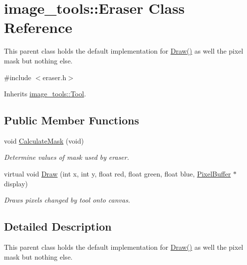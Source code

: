 \hypertarget{classimage__tools_1_1Eraser}{}\section{image\+\_\+tools\+:\+:Eraser Class Reference}
\label{classimage__tools_1_1Eraser}


This parent class holds the default implementation for \hyperlink{classimage__tools_1_1Eraser_a4c644291d415b8af7b60c0aaa9940345}{Draw()} as well the pixel mask but nothing else.  




{\ttfamily \#include $<$eraser.\+h$>$}



Inherits \hyperlink{classimage__tools_1_1Tool}{image\+\_\+tools\+::\+Tool}.

\subsection*{Public Member Functions}
\begin{DoxyCompactItemize}
\item 
void \hyperlink{classimage__tools_1_1Eraser_ad610a5440a7d6b8d5ba3b8ac6e905acf}{Calculate\+Mask} (void)\hypertarget{classimage__tools_1_1Eraser_ad610a5440a7d6b8d5ba3b8ac6e905acf}{}\label{classimage__tools_1_1Eraser_ad610a5440a7d6b8d5ba3b8ac6e905acf}

\begin{DoxyCompactList}\small\item\em Determine values of mask used by eraser. \end{DoxyCompactList}\item 
virtual void \hyperlink{classimage__tools_1_1Eraser_a4c644291d415b8af7b60c0aaa9940345}{Draw} (int x, int y, float red, float green, float blue, \hyperlink{classimage__tools_1_1PixelBuffer}{Pixel\+Buffer} $\ast$display)\hypertarget{classimage__tools_1_1Eraser_a4c644291d415b8af7b60c0aaa9940345}{}\label{classimage__tools_1_1Eraser_a4c644291d415b8af7b60c0aaa9940345}

\begin{DoxyCompactList}\small\item\em Draws pixels changed by tool onto canvas. \end{DoxyCompactList}\end{DoxyCompactItemize}


\subsection{Detailed Description}
This parent class holds the default implementation for \hyperlink{classimage__tools_1_1Eraser_a4c644291d415b8af7b60c0aaa9940345}{Draw()} as well the pixel mask but nothing else. 

